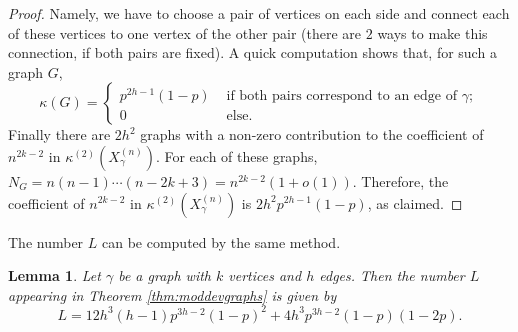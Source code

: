 \documentclass[12pt,a4paper,reqno]{amsart}
\newtheorem{lemma}{Lemma}[section]
\theoremstyle{remark}
\newcommand{\SubGraph}{X^{(n)}}
\begin{document}
\begin{proof}
\noindent Namely, we have to choose a pair of vertices on each side and connect each of these vertices to one vertex of the other pair (there are $2$ ways to make this connection, if both pairs are fixed). A quick computation shows that, for such a graph $G$,
\[\kappa(G)=\begin{cases}
    p^{2h-1} (1-p) &\text{ if both pairs correspond to an edge of }\gamma;\\
    0 & \text{ else.}
\end{cases}\]
Finally there are $2 h^2$ graphs with a non-zero contribution to the coefficient of $n^{2k-2}$ in $\kappa^{(2)}(\SubGraph_\gamma)$.
For each of these graphs, $N_G=n(n-1)\cdots(n-2k+3)=n^{2k-2}(1+o(1))$. Therefore, the coefficient of $n^{2k-2}$ in $\kappa^{(2)}(\SubGraph_\gamma)$ is $2 h^2 p^{2h-1} (1-p)$, as claimed.
\end{proof}\bigskip

The number $L$ can be computed by the same method.
\begin{lemma}
Let $\gamma$ be a graph with $k$ vertices and $h$ edges. Then the number $L$ appearing in Theorem \ref{thm:moddevgraphs} is given by
$$L =12 h^3 (h-1) p^{3h-2} (1-p)^2 + 4 h^3 p^{3h-2} (1-p) (1-2p).$$
\end{lemma}
\end{document}
